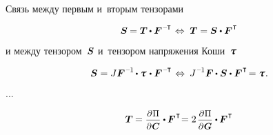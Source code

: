 \begin{otherlanguage}{russian}
Связь между первым и~вторым тензорами

\nopagebreak\vspace{-0.12em}\begin{equation*}
\secondpiolakirchhoffstress \hspace{-0.1ex} = \firstpiolakirchhoffstress \hspace{-0.1ex} \dotp \bm{F}^{\hspace{.1ex}\expminusT}
\hspace{.2ex} \Leftrightarrow \hspace{.64ex}
\firstpiolakirchhoffstress = \secondpiolakirchhoffstress \dotp \bm{F}^{\hspace{.1ex}\T}
\end{equation*}

\vspace{-0.2em} \noindent и между тензором~$\bm{S}$ и~тензором напряжения Коши~$\cauchystress$

\nopagebreak\vspace{-0.12em}\begin{equation*}
\secondpiolakirchhoffstress = J \bm{F}^{\hspace{.1ex}\expminusone} \hspace{-0.2ex} \dotp \cauchystress \hspace{.16ex} \dotp \bm{F}^{\hspace{.1ex}\expminusT}
\hspace{.2ex} \Leftrightarrow \hspace{.5ex}
J^{\hspace{.12ex}\expminusone} \bm{F} \hspace{-0.1ex} \dotp \secondpiolakirchhoffstress \dotp \bm{F}^{\hspace{.1ex}\T} \hspace{-0.32ex}
= \cauchystress \hspace{.1ex}.
\end{equation*}

...

\begin{equation*}
\firstpiolakirchhoffstress \hspace{-0.1ex}
= \scalebox{0.92}{$ \displaystyle \frac{\partial \hspace{.1ex} \Pi}{\raisemath{-0.1em}{\partial \hspace{.1ex} \bm{C}}} $} \dotp \hspace{-0.1ex} \bm{F}^{\hspace{.1ex}\T} \hspace{-0.5ex}
= 2 \hspace{.25ex} \scalebox{0.92}{$ \displaystyle \frac{\partial \hspace{.1ex} \Pi}{\raisemath{-0.1em}{\partial \hspace{.1ex} \bm{G}}} $} \dotp \hspace{-0.1ex} \bm{F}^{\hspace{.1ex}\T}
\end{equation*}


\end{otherlanguage}
